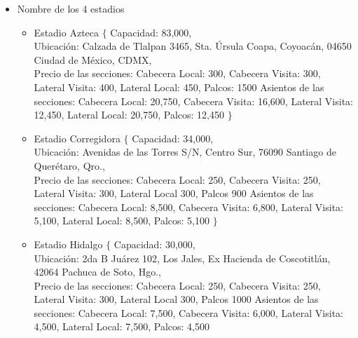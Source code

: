 \begin{itemize}
    \item Nombre de los 4 estadios
    \begin{itemize}
        \item Estadio Azteca      $\{$ Capacidad: 83,000, \\
                                       Ubicación: Calzada de Tlalpan 3465, Sta. Úrsula Coapa, Coyoacán, 04650 Ciudad de México, CDMX,\\
                                       Precio de las secciones: Cabecera Local: 300, Cabecera Visita: 300, Lateral Visita: 400, Lateral Local: 450, Palcos: 1500
                                       Asientos de las secciones: Cabecera Local: 20,750, Cabecera Visita: 16,600, Lateral Visita: 12,450, Lateral Local: 20,750, Palcos: 12,450
                                  $\}$
        \item Estadio Corregidora $\{$ Capacidad: 34,000, \\
                                       Ubicación: Avenidas de las Torres S/N, Centro Sur, 76090 Santiago de Querétaro, Qro.,\\
                                       Precio de las secciones: Cabecera Local: 250, Cabecera Visita: 250, Lateral Visita: 300, Lateral Local 300, Palcos 900
                                       Asientos de las secciones: Cabecera Local: 8,500, Cabecera Visita: 6,800, Lateral Visita: 5,100, Lateral Local: 8,500, Palcos: 5,100
                                  $\}$        
        \item Estadio Hidalgo     $\{$ Capacidad: 30,000, \\
                                       Ubicación: 2da B Juárez 102, Los Jales, Ex Hacienda de Coscotitlán, 42064 Pachuca de Soto, Hgo.,\\
                                       Precio de las secciones: Cabecera Local: 250, Cabecera Visita: 250, Lateral Visita: 300, Lateral Local 300, Palcos 1000
                                       Asientos de las secciones: Cabecera Local: 7,500, Cabecera Visita: 6,000, Lateral Visita: 4,500, Lateral Local: 7,500, Palcos: 4,500
                                       

\end{itemize}
\end{itemize}
